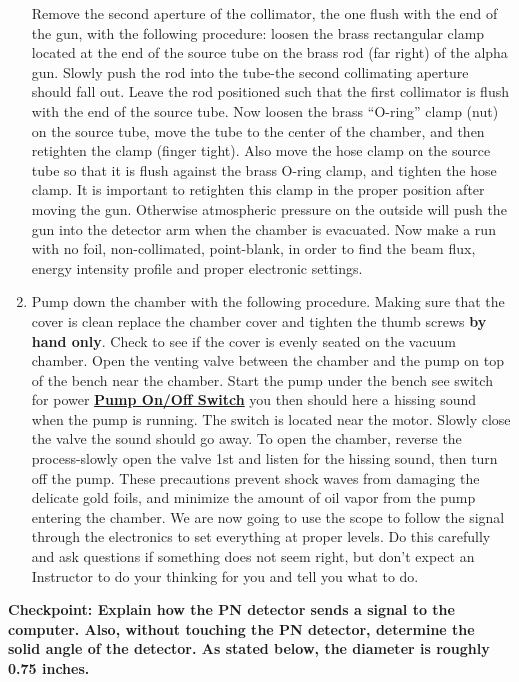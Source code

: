\documentclass{../lab}
\begin{document}
\begin{enumerate}
    Remove the second aperture of the collimator, the one flush with the end of the gun, with the following procedure: loosen the brass rectangular clamp located at the end of the source tube on the brass rod (far right) of the alpha gun. Slowly push the rod into the tube-the second collimating aperture should fall out. Leave the rod positioned such that the first collimator is flush with the end of the source tube. Now loosen the brass ``O-ring'' clamp (nut) on the source tube, move the tube to the center of the chamber, and then retighten the clamp (finger tight). Also move the hose clamp on the source tube so that it is flush against the brass O-ring clamp, and tighten the hose clamp. It is important to retighten this clamp in the proper position after moving the gun. Otherwise atmospheric pressure on the outside will push the gun into the detector arm when the chamber is evacuated. Now make a run with no foil, non-collimated, point-blank, in order to find the beam flux, energy intensity profile and proper electronic settings.

    \item Pump down the chamber with the following procedure. Making sure that the cover is clean replace the chamber cover and tighten the thumb screws \textbf{by hand only}. Check to see if the cover is evenly seated on the vacuum chamber. Open the venting valve between the chamber and the pump on top of the bench near the chamber. Start the pump under the bench see switch for power \href{http://experimentationlab.berkeley.edu/sites/default/files/images/Pump\_Switch\_3535.jpg}{\textbf{Pump On/Off Switch}} you then should here a hissing sound when the pump is running. The switch is located near the motor. Slowly close the valve the sound should go away. To open the chamber, reverse the process-slowly open the valve 1st and listen for the hissing sound, then turn off the pump. These precautions prevent shock waves from damaging the delicate gold foils, and minimize the amount of oil vapor from the pump entering the chamber. We are now going to use the scope to follow the signal through the electronics to set everything at proper levels. Do this carefully and ask questions if something does not seem right, but don't expect an Instructor to do your thinking for you and tell you what to do.

\end{enumerate}

\textbf{Checkpoint: Explain how the PN detector sends a signal to the computer. Also, without touching the PN detector, determine the solid angle of the detector. As stated below, the diameter is roughly 0.75 inches.}
\end{document}
